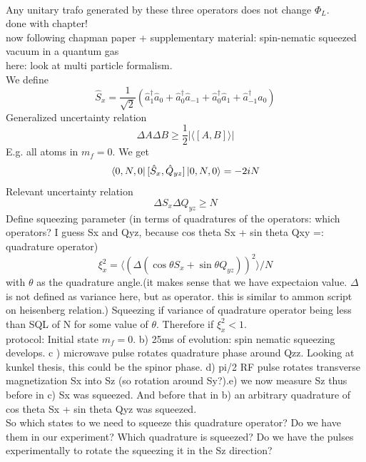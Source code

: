 \\
Any unitary trafo generated by these three operators does not change $\Phi_L$.
\\
done with chapter!
\\
now following chapman paper + supplementary material: spin-nematic squeezed vacuum in a quantum gas
\\
here: look at multi particle formalism.
\\
We define
\begin{equation}
	\hat{S}_x = \frac{1}{\sqrt{2}}( \hat{a}_1^\dag \hat{a}_0 + \hat{a}_0^\dag \hat{a}_{-1} + \hat{a}_0^\dag \hat{a}_1 + \hat{a}_{-1}^\dag \hat{a}_0)
\end{equation}
Generalized uncertainty relation
\begin{equation}
	\Delta A \Delta B \geq \frac{1}{2} |\langle [A,B] \rangle |
\end{equation}
E.g. all atoms in $m_f = 0$. We get 
\begin{equation}
	\bra{0,N,0} [\hat{S}_x , \hat{Q}_{yz} ] \ket{0,N,0} = - 2iN
\end{equation}
Relevant uncertainty relation
\begin{equation}
	\Delta S_x \Delta Q_{yz} \geq N
\end{equation}
Define squeezing parameter (in terms of quadratures of the operators: which operators? I guess Sx and Qyz, because cos theta Sx + sin theta Qxy =: quadrature operator)
\begin{equation}
	\xi_{x}^2 = \langle ( \Delta (\cos \theta S_{x} + \sin \theta Q_{yz}))^2 \rangle /N
\end{equation}
with $\theta$ as the quadrature angle.(it makes sense that we have expectaion value. $\Delta$ is not defined as variance here, but as operator. this is similar to ammon script on heisenberg relation.) Squeezing if variance of quadrature operator being less than SQL of N for some value of $\theta$. 
Therefore if $\xi_x^2 < 1$.
\\
protocol: Initial state $m_f = 0$. b) 25ms of evolution: spin nematic squeezing develops. c ) microwave pulse rotates quadrature phase around Qzz. Looking at kunkel thesis, this could be the spinor phase.  d) pi/2 RF pulse rotates transverse magnetization Sx into Sz (so rotation around Sy?).e) we now measure Sz thus before in c) Sx was squeezed. And before that in b) an arbitrary quadrature of cos theta Sx + sin theta Qyz was squeezed. 
\\
So which states to we need to squeeze this quadrature operator? Do we have them in our experiment? Which quadrature is squeezed? Do we have the pulses experimentally to rotate the squeezing it in the Sz direction?
